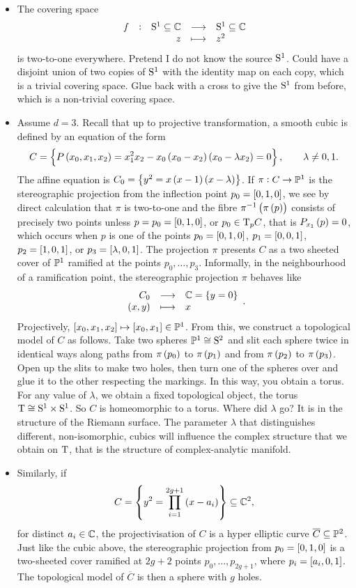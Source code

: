\begin{example*}
\hfill
\begin{itemize}
\item The covering space
$$ \function[f]{\S^1 \subseteq \CC}{\S^1 \subseteq \CC}{z}{z^2} $$
is two-to-one everywhere. Pretend I do not know the source $ \S^1 $. Could have a disjoint union of two copies of $ \S^1 $ with the identity map on each copy, which is a trivial covering space. Glue back with a cross to give the $ \S^1 $ from before, which is a non-trivial covering space.
\item Assume $ d = 3 $. Recall that up to projective transformation, a smooth cubic is defined by an equation of the form
$$ C = \cbr{P\br{x_0, x_1, x_2} = x_1^2x_2 - x_0\br{x_0 - x_2}\br{x_0 - \lambda x_2} = 0}, \qquad \lambda \ne 0, 1. $$
The affine equation is $ C_0 = \cbr{y^2 = x\br{x - 1}\br{x - \lambda}} $. If $ \pi : C \to \PP^1 $ is the stereographic projection from the inflection point $ p_0 = \sbr{0, 1, 0} $, we see by direct calculation that $ \pi $ is two-to-one and the fibre $ \pi^{-1}\br{\pi\br{p}} $ consists of precisely two points unless $ p = p_0 = \sbr{0, 1, 0} $, or $ p_0 \in \T_p C $, that is $ P_{x_1}\br{p} = 0 $, which occurs when $ p $ is one of the points $ p_0 = \sbr{0, 1, 0} $, $ p_1 = \sbr{0, 0, 1} $, $ p_2 = \sbr{1, 0, 1} $, or $ p_3 = \sbr{\lambda, 0, 1} $. The projection $ \pi $ presents $ C $ as a two sheeted cover of $ \PP^1 $ ramified at the points $ p_0, \dots, p_3 $. Informally, in the neighbourhood of a ramification point, the stereographic projection $ \pi $ behaves like
$$ \function{C_0}{\CC = \cbr{y = 0}}{\br{x, y}}{x}. $$
Projectively, $ \sbr{x_0, x_1, x_2} \mapsto \sbr{x_0, x_1} \in \PP^1 $. From this, we construct a topological model of $ C $ as follows. Take two spheres $ \PP^1 \cong \S^2 $ and slit each sphere twice in identical ways along paths from $ \pi\br{p_0} $ to $ \pi\br{p_1} $ and from $ \pi\br{p_2} $ to $ \pi\br{p_3} $. Open up the slits to make two holes, then turn one of the spheres over and glue it to the other respecting the markings. In this way, you obtain a torus. For any value of $ \lambda $, we obtain a fixed topological object, the torus $ \T \cong \S^1 \times \S^1 $. So $ C $ is homeomorphic to a torus. Where did $ \lambda $ go? It is in the structure of the Riemann surface. The parameter $ \lambda $ that distinguishes different, non-isomorphic, cubics will influence the complex structure that we obtain on $ \T $, that is the structure of complex-analytic manifold.

\pagebreak

\item Similarly, if
$$ C = \cbr{y^2 = \prod_{i = 1}^{2g + 1} \br{x - a_i}} \subseteq \CC^2, $$
for distinct $ a_i \in \CC $, the projectivisation of $ C $ is a hyper elliptic curve $ \overline{C} \subseteq \PP^2 $. Just like the cubic above, the stereographic projection from $ p_0 = \sbr{0, 1, 0} $ is a two-sheeted cover ramified at $ 2g + 2 $ points $ p_0, \dots, p_{2g + 1} $, where $ p_i = \sbr{a_i, 0, 1} $. The topological model of $ \overline{C} $ is then a sphere with $ g $ holes.
\end{itemize}
\end{example*}


